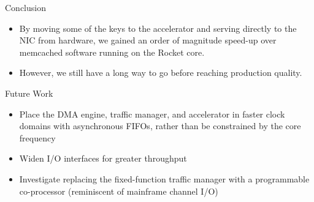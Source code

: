 \begin{block}{Conclusion}
\footnotesize
\begin{itemize}
    \item By moving some of the keys to the accelerator and serving directly
        to the NIC from hardware, we gained an order of magnitude speed-up
        over memcached software running on the Rocket core.
    \item However, we still have a long way to go before reaching
        production quality.
\end{itemize}
\end{block}

\vspace{1ex}

\begin{block}{Future Work}
\footnotesize
\begin{itemize}
    \item Place the DMA engine, traffic manager, and accelerator in
	faster clock domains with asynchronous FIFOs, rather than be
	constrained by the core frequency
    \item Widen I/O interfaces for greater throughput
    \item Investigate replacing the fixed-function traffic manager with
        a programmable co-processor (reminiscent of mainframe channel
	I/O)
\end{itemize}
\end{block}
